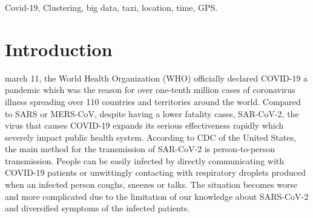 \documentclass[journal]{IEEEtran}
\begin{document}
\begin{IEEEkeywords}
Covid-19, Clustering, big data, taxi, location, time, GPS.
\end{IEEEkeywords}

%
\IEEEpeerreviewmaketitle


\section{Introduction}
% 
% 
% 
% 
march 11, the World Health Organization (WHO) officially declared COVID-19 a pandemic which was the reason for over one-tenth million cases of coronavirus illness spreading over 110 countries and territories around the world\cite{WhoPandemic}. Compared to SARS or MERS-CoV, despite having a lower fatality cases, SAR-CoV-2, the virus that causes COVID-19 expands its serious effectiveness rapidly which severely impact public health system\cite{doi:10.1056/NEJMoa2002032}. According to CDC of the United States, the main method for the transmission of SAR-CoV-2 is person-to-person transmission. People can be easily infected by directly communicating with COVID-19 patients or unwittingly contacting with respiratory droplets produced when an infected person coughs, sneezes or talks\cite{HowCoronavirusSpreads}. The situation becomes worse and more complicated due to the limitation of our knowledge about SARS-CoV-2 and diversified symptoms of the infected patients\cite{wu2020co}. 
\end{document}

